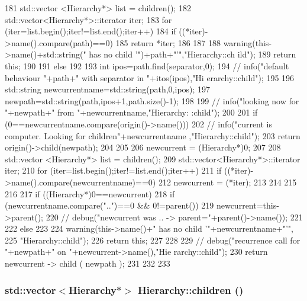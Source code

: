 \begin{DoxyCode}
{{{181       std::vector <Hierarchy*> list = children();
182       std::vector<Hierarchy*>::iterator iter;
183       for (iter=list.begin();iter!=list.end();iter++){
184         if ((*iter)->name().compare(path)==0){
185           return *iter;
186         }
187       }
188       warning(this->name()+std::string(" has no child '")+path+"'","Hierarchy::ch
      ild");
189       return this;
190     }
191     else
192     {
193       int ipos=path.find(separator,0);
194       //      info("default behaviour "+path+" with separator in "+itos(ipos),"Hi
      erarchy::child");
195 
196       std::string newcurrentname=std::string(path,0,ipos);
197       newpath=std::string(path,ipos+1,path.size()-1);
198 
199       //      info("looking now for "+newpath+" from "+newcurrentname,"Hierarchy:
      :child");
200 
201       if (0==newcurrentname.compare(origin()->name())){
202         //        info("current is computer. Looking for children"+newcurrentname
      ,"Hierarchy::child");
203         return origin()->child(newpath);
204       }
205 
206       newcurrent = (Hierarchy*)0;
207 
208       std::vector <Hierarchy*> list = children();
209       std::vector<Hierarchy*>::iterator iter;
210       for (iter=list.begin();iter!=list.end();iter++){
211         if ((*iter)->name().compare(newcurrentname)==0){
212           newcurrent = (*iter);
213         }
214       }
215 
216 
217       if ((Hierarchy*)0==newcurrent){
218         if (newcurrentname.compare("..")==0 && 0!=parent()){
219           newcurrent=this->parent();
220           //          debug("newcurrent was .. -> parent="+parent()->name());
221         }
222         else
223         {
224           warning(this->name()+" has no child '"+newcurrentname+"'",
225               "Hierarchy::child");
226           return this;
227         }
228       }
229       //      debug("recurrence call for "+newpath+" on "+newcurrent->name(),"Hie
      rarchy::child");
230       return newcurrent -> child ( newpath );
231     }
232   }
233 }
\end{DoxyCode}
\hypertarget{classHierarchy_aa9a76f69e98e052ee1a6e32cea006288}{
\subsubsection[{children}]{\setlength{\rightskip}{0pt plus 5cm}std::vector$<${\bf Hierarchy}$\ast$$>$ Hierarchy::children ()}}
\label{classHierarchy_aa9a76f69e98e052ee1a6e32cea006288}


